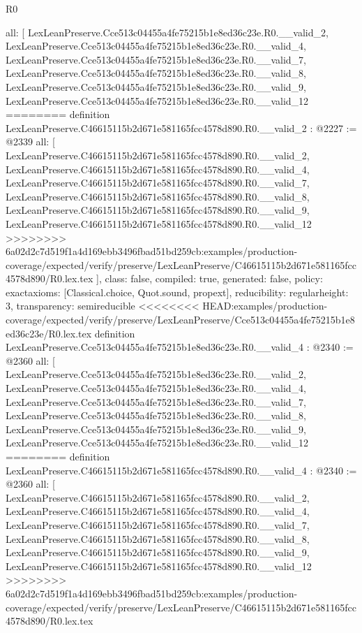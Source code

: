 \begin{lexlean}{R0}
\begin{coremodule}
{{{{{{{{{{{{{{{{{{{{{{{{{{{{{{{{{{{{{{{{{{{{  all: [
    LexLeanPreserve.Cce513c04455a4fe75215b1e8ed36c23e.R0.__valid_2,
    LexLeanPreserve.Cce513c04455a4fe75215b1e8ed36c23e.R0.__valid_4,
    LexLeanPreserve.Cce513c04455a4fe75215b1e8ed36c23e.R0.__valid_7,
    LexLeanPreserve.Cce513c04455a4fe75215b1e8ed36c23e.R0.__valid_8,
    LexLeanPreserve.Cce513c04455a4fe75215b1e8ed36c23e.R0.__valid_9,
    LexLeanPreserve.Cce513c04455a4fe75215b1e8ed36c23e.R0.__valid_12
========
definition LexLeanPreserve.C46615115b2d671e581165fcc4578d890.R0.__valid_2 : @2227 := @2339 {
  all: [
    LexLeanPreserve.C46615115b2d671e581165fcc4578d890.R0.__valid_2,
    LexLeanPreserve.C46615115b2d671e581165fcc4578d890.R0.__valid_4,
    LexLeanPreserve.C46615115b2d671e581165fcc4578d890.R0.__valid_7,
    LexLeanPreserve.C46615115b2d671e581165fcc4578d890.R0.__valid_8,
    LexLeanPreserve.C46615115b2d671e581165fcc4578d890.R0.__valid_9,
    LexLeanPreserve.C46615115b2d671e581165fcc4578d890.R0.__valid_12
>>>>>>>> 6a02d2c7d519f1a4d169ebb3496fbad51bd259cb:examples/production-coverage/expected/verify/preserve/LexLeanPreserve/C46615115b2d671e581165fcc4578d890/R0.lex.tex
  ],
  class: false,
  compiled: true,
  generated: false,
  policy: exact{axioms: [Classical.choice, Quot.sound, propext]},
  reducibility: regular{height: 3},
  transparency: semireducible
}
<<<<<<<< HEAD:examples/production-coverage/expected/verify/preserve/LexLeanPreserve/Cce513c04455a4fe75215b1e8ed36c23e/R0.lex.tex
definition LexLeanPreserve.Cce513c04455a4fe75215b1e8ed36c23e.R0.__valid_4 : @2340 := @2360 {
  all: [
    LexLeanPreserve.Cce513c04455a4fe75215b1e8ed36c23e.R0.__valid_2,
    LexLeanPreserve.Cce513c04455a4fe75215b1e8ed36c23e.R0.__valid_4,
    LexLeanPreserve.Cce513c04455a4fe75215b1e8ed36c23e.R0.__valid_7,
    LexLeanPreserve.Cce513c04455a4fe75215b1e8ed36c23e.R0.__valid_8,
    LexLeanPreserve.Cce513c04455a4fe75215b1e8ed36c23e.R0.__valid_9,
    LexLeanPreserve.Cce513c04455a4fe75215b1e8ed36c23e.R0.__valid_12
========
definition LexLeanPreserve.C46615115b2d671e581165fcc4578d890.R0.__valid_4 : @2340 := @2360 {
  all: [
    LexLeanPreserve.C46615115b2d671e581165fcc4578d890.R0.__valid_2,
    LexLeanPreserve.C46615115b2d671e581165fcc4578d890.R0.__valid_4,
    LexLeanPreserve.C46615115b2d671e581165fcc4578d890.R0.__valid_7,
    LexLeanPreserve.C46615115b2d671e581165fcc4578d890.R0.__valid_8,
    LexLeanPreserve.C46615115b2d671e581165fcc4578d890.R0.__valid_9,
    LexLeanPreserve.C46615115b2d671e581165fcc4578d890.R0.__valid_12
>>>>>>>> 6a02d2c7d519f1a4d169ebb3496fbad51bd259cb:examples/production-coverage/expected/verify/preserve/LexLeanPreserve/C46615115b2d671e581165fcc4578d890/R0.lex.tex
}}}}}}}}}}}}}}}}}}}}}}}}}}}}}}}}}}}}}}}}}}}}}}
\end{coremodule}
\end{lexlean}
